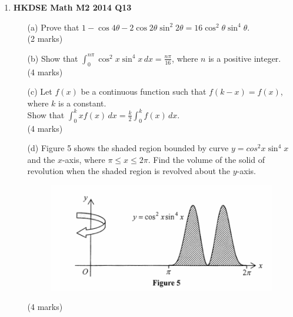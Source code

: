 \documentclass[12pt]{article}
\begin{document}
\begin{enumerate}
	\item \textbf{HKDSE Math M2 2014 Q13}
	\begin{enumerate}
		\item [(a)]Prove that $1 - \cos{4\theta} - 2\cos{2\theta}\sin^2{2\theta} = 16\cos^2{\theta}\sin^4{\theta}$. \\(2 marks)
		\item [(b)]Show that $\displaystyle\int_{0}^{n\pi} \cos^2{x}\sin^4{x} \,dx = \displaystyle\frac{n\pi}{16}$, where $n$ is a positive integer.\\(4 marks)
		\item [(c)]Let $f(x)$ be a continuous function such that $f(k-x) = f(x)$, where $k$ is a constant.\\
		Show that $\displaystyle\int_{0}^k xf(x)\, dx = \frac{k}{2} \int_{0}^k f(x) \,dx$. \\(4 marks)
		\item [(d)]Figure 5 shows the shaded region bounded by curve $y = cos^2{x} \sin^4{x}$ and the $x$-axis, where $\pi \leq x \leq 2\pi$. Find the volume of the solid of revolution when the shaded region is revolved about the $y$-axis.
			\begin{figure}[H]
				\centering
				\includegraphics[width = .5\linewidth]{2014Figure5}
			\end{figure}
			(4 marks)
	\end{enumerate}
\end{enumerate}
\end{document}
